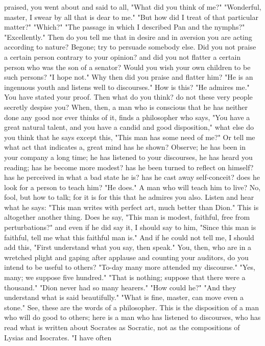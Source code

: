 \documentclass[a4paper]{article}
\begin{document}
praised, you went about and said to all, "What did you think of me?"
"Wonderful, master, I swear by all that is dear to me." "But how did I treat of
that particular matter?" "Which?" "The passage in which I described Pan and the
nymphs?" "Excellently." Then do you tell me that in desire and in aversion you
are acting according to nature? Begone; try to persuade somebody else. Did you
not praise a certain person contrary to your opinion? and did you not flatter a
certain person who was the son of a senator? Would you wish your own children
to be such persons? "I hope not." Why then did you praise and flatter him? "He
is an ingenuous youth and listens well to discourses." How is this? "He admires
me." You have stated your proof. Then what do you think? do not these very
people secretly despise you? When, then, a man who is conscious that he has
neither done any good nor ever thinks of it, finds a philosopher who says, "You
have a great natural talent, and you have a candid and good disposition," what
else do you think that he says except this, "This man has some need of me?" Or
tell me what act that indicates a, great mind has he shown? Observe; he has
been in your company a long time; he has listened to your discourses, he has
heard you reading; has he become more modest? has he been turned to reflect on
himself? has he perceived in what a bad state he is? has he cast away
self-conceit? does he look for a person to teach him? "He does." A man who will
teach him to live? No, fool, but how to talk; for it is for this that he
admires you also. Listen and hear what he says: "This man writes with perfect
art, much better than Dion." This is altogether another thing. Does he say,
"This man is modest, faithful, free from perturbations?" and even if he did say
it, I should say to him, "Since this man is faithful, tell me what this
faithful man is." And if he could not tell me, I should add this, "First
understand what you say, then speak."
    You, then, who are in a wretched plight and gaping after applause and
counting your auditors, do you intend to be useful to others? "To-day many more
attended my discourse." "Yes, many; we suppose five hundred." "That is nothing;
suppose that there were a thousand." "Dion never had so many hearers." "How
could he?" "And they understand what is said beautifully." "What is fine,
master, can move even a stone." See, these are the words of a philosopher. This
is the disposition of a man who will do good to others; here is a man who has
listened to discourses, who has read what is written about Socrates as
Socratic, not as the compositions of Lysias and Isocrates. "I have often
\end{document}
